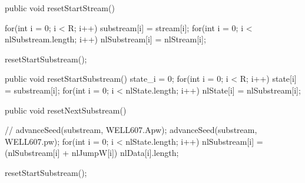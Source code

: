 \begin{code}
  \begin{hide}
   public void resetStartStream() {
      for(int i = 0; i < R; i++)
         substream[i] = stream[i];
      for(int i = 0; i < nlSubstream.length; i++)
         nlSubstream[i] = nlStream[i];

      resetStartSubstream();
   }

   public void resetStartSubstream() {
      state_i = 0;
      for(int i = 0; i < R; i++)
         state[i] = substream[i];
      for(int i = 0; i < nlState.length; i++)
         nlState[i] = nlSubstream[i];
   }

   public void resetNextSubstream() {
//      advanceSeed(substream, WELL607.Apw);
      advanceSeed(substream, WELL607.pw);
      for(int i = 0; i < nlState.length; i++)
         nlSubstream[i] = (nlSubstream[i] + nlJumpW[i]) %
                          nlData[i].length;

      resetStartSubstream();
   }\end{hide}
\end{code}

